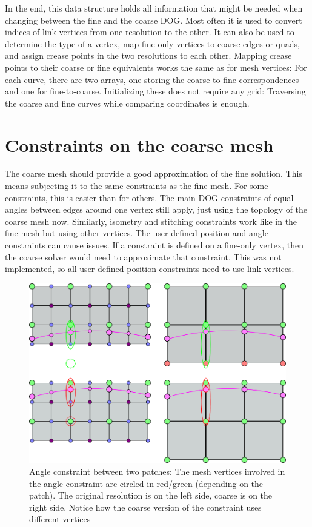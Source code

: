 \documentclass[a4paper,twoside,12pt,nochapterprefix]{scrbook}
\begin{document}
In the end, this data structure holds all information that might be needed when changing between the fine and the coarse DOG. Most often it is used to convert indices of link vertices from one resolution to the other. It can also be used to determine the type of a vertex, map fine-only vertices to coarse edges or quads, and assign crease points in the two resolutions to each other.\newline
Mapping crease points to their coarse or fine equivalents works the same as for mesh vertices: For each curve, there are two arrays, one storing the coarse-to-fine correspondences and one for fine-to-coarse. Initializing these does not require any grid: Traversing the coarse and fine curves while comparing coordinates is enough.\newline
\section{Constraints on the coarse mesh}\label{sec:coarse_constraints}
The coarse mesh should provide a good approximation of the fine solution. This means subjecting it to the same constraints as the fine mesh. For some constraints, this is easier than for others.\newline
The main DOG constraints of equal angles between edges around one vertex still apply, just using the topology of the coarse mesh now. Similarly, isometry and stitching constraints work like in the fine mesh but using other vertices.\newline
The user-defined position and angle constraints can cause issues. If a constraint is defined on a fine-only vertex, then the coarse solver would need to approximate that constraint. This was not implemented, so all user-defined position constraints need to use link vertices.\newline
\begin{figure}
    \centering
    \includegraphics[width=0.8\linewidth]{figures/0311_coarse_angle}
    \caption{Angle constraint between two patches: The mesh vertices involved in the angle constraint are circled in red/green (depending on the patch). The original resolution is on the left side, coarse is on the right side. Notice how the coarse version of the constraint uses different vertices}
      \label{fig:angleconstraint_ftc}
\end{figure}
\end{document}
